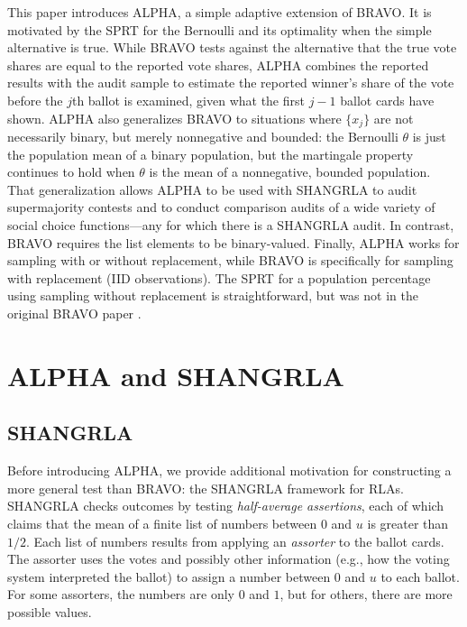 \documentclass[aoas]{imsart}
\begin{document}
This paper introduces ALPHA, a simple adaptive extension of BRAVO.
It is motivated by the SPRT for the Bernoulli and its optimality when the simple alternative is true.
While BRAVO tests against the alternative that the true vote shares are equal to the reported vote shares,
ALPHA combines the reported results with the audit sample to
estimate the reported winner's share of the vote before the $j$th ballot is examined, given
what the first $j-1$ ballot cards have shown. 
ALPHA also generalizes BRAVO to situations where $\{x_j\}$ are not necessarily binary, 
but merely nonnegative and bounded: the Bernoulli $\theta$ is just the population mean of a binary population,
but the martingale property continues to hold when $\theta$ is the mean of a nonnegative, bounded population.
That generalization allows ALPHA to be used with SHANGRLA to audit supermajority contests
and to conduct comparison audits of a wide variety of social choice functions---any for which there is a
SHANGRLA audit.
In contrast, BRAVO requires the list elements to be binary-valued.
Finally, ALPHA works for sampling with or without replacement, while BRAVO is specifically for sampling 
with replacement (IID observations).
The SPRT for a population percentage using sampling without replacement is straightforward, but was not
in the original BRAVO paper \citep{lindemanEtal12}.

\section{ALPHA and SHANGRLA}

\subsection{SHANGRLA} \label{sec:shangrla}
Before introducing ALPHA, we provide additional motivation for constructing a more general test than BRAVO: 
the SHANGRLA framework for RLAs.
SHANGRLA \citep{stark20} checks outcomes by testing \emph{half-average assertions}, each of which claims 
that the mean of a finite list of
numbers between $0$ and $u$ is greater than $1/2$.
Each list of numbers results from applying an \emph{assorter} to the ballot cards.
The assorter uses the votes and possibly other information (e.g., how the voting system interpreted the ballot)
to assign a number between $0$ and $u$ to each ballot.
For some assorters, the numbers are only $0$ and $1$, but for others, there are more possible values.
\end{document}
